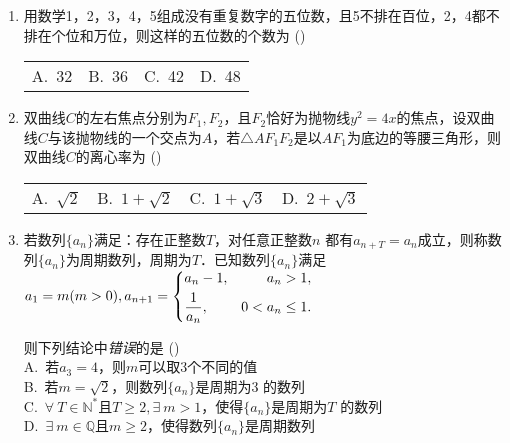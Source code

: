 \documentclass[a4paper]{ctexart}%
\makeatletter
\newcommand{\fourch}[4]{(\qquad)\\
\begin{tabular}{*{4}{@{}p{0.21\textwidth}}}A.~#1 & B.~#2 & C.~#3 & D.~#4\end{tabular}}
\newcommand{\onech}[4]{(\qquad)\\  A.~#1 \\ B.~#2 \\ C.~#3 \\ D.~#4}
\makeatother
\begin{document}
\begin{itemize}
\begin{enumerate}[leftmargin=*]
\item 用数学1，2，3，4，5组成没有重复数字的五位数，且5不排在百位，2，4都不排在个位和万位，则这样的五位数的个数为
\fourch{32} {36} {42} {48}




\item 双曲线$C$的左右焦点分别为$F_1,F_2$，且$F_2$恰好为抛物线$y^2=4x$的焦点，设双曲线$C$与该抛物线的一个交点为$A$，若$\triangle AF_1F_2$是以$AF_1$为底边的等腰三角形，则双曲线$C$的离心率为
    \fourch{$\sqrt 2$}{$1+\sqrt 2$}{$1+\sqrt 3$}{$2+\sqrt 3$}



\item 若数列$\{a_n\}$满足：存在正整数$T$，对任意正整数$n$ 都有$a_{n+T}=a_n$成立，则称数列$\{a_n\}$为周期数列，周期为$T$．已知数列$\{a_n\}$满足$a_1=m(m>0), a_{n+1}=\left\{\linespread{1}\selectfont\begin{aligned}
  &a_n-1,&a_n>1,\\&\dfrac 1{a_n},&0<a_n\le 1.\end{aligned}\right.$

  则下列结论中\emph{错误}的是
\onech{若$a_3=4$，则$m$可以取3个不同的值}{若$m=\sqrt 2$，则数列$\{a_n\}$是周期为3 的数列}{$\forall\  T\in \mathbb{N}^*$且$T\ge 2,\exists \  m>1$，使得$\{a_n\}$是周期为$T$ 的数列}{$\exists \  m \in \mathbb{Q}$且$m\ge 2$，使得数列$\{a_n\}$是周期数列}

\end{enumerate}
\end{itemize}
\end{document}
